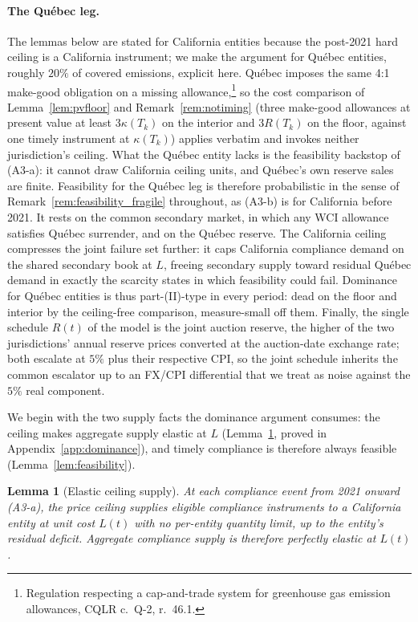 \documentclass[11pt,letterpaper]{article}
\theoremstyle{plain}
\newtheorem{lemma}[theorem]{Lemma}
\theoremstyle{definition}
\numberwithin{equation}{section}
\begin{document}
\paragraph{The Québec leg.}
The lemmas below are stated for California entities because the post-2021 hard ceiling is a California instrument; we make the argument for Québec entities, roughly $20\%$ of covered emissions, explicit here. Québec imposes the same 4:1 make-good obligation on a missing allowance,\footnote{Regulation respecting a cap-and-trade system for greenhouse gas emission allowances, CQLR c.~Q-2, r.~46.1.} so the cost comparison of Lemma~\ref{lem:pvfloor} and Remark~\ref{rem:notiming} (three make-good allowances at present value at least $3\kappa(T_k)$ on the interior and $3R(T_k)$ on the floor, against one timely instrument at $\kappa(T_k)$) applies verbatim and invokes neither jurisdiction's ceiling. What the Québec entity lacks is the feasibility backstop of (A3-a): it cannot draw California ceiling units, and Québec's own reserve sales are finite. Feasibility for the Québec leg is therefore probabilistic in the sense of Remark~\ref{rem:feasibility_fragile} throughout, as (A3-b) is for California before 2021. It rests on the common secondary market, in which any WCI allowance satisfies Québec surrender, and on the Québec reserve. The California ceiling compresses the joint failure set further: it caps California compliance demand on the shared secondary book at $L$, freeing secondary supply toward residual Québec demand in exactly the scarcity states in which feasibility could fail. Dominance for Québec entities is thus part-(II)-type in every period: dead on the floor and interior by the ceiling-free comparison, measure-small off them. Finally, the single schedule $R(t)$ of the model is the joint auction reserve, the higher of the two jurisdictions' annual reserve prices converted at the auction-date exchange rate; both escalate at $5\%$ plus their respective CPI, so the joint schedule inherits the common escalator up to an FX/CPI differential that we treat as noise against the $5\%$ real component.

We begin with the two supply facts the dominance argument consumes: the ceiling makes aggregate supply elastic at $L$ (Lemma~\ref{lem:ceiling}, proved in Appendix~\ref{app:dominance}), and timely compliance is therefore always feasible (Lemma~\ref{lem:feasibility}).

\begin{lemma}[Elastic ceiling supply]\label{lem:ceiling}
At each compliance event from 2021 onward (A3-a), the price ceiling supplies eligible compliance instruments to a California entity at unit cost $L(t)$ with no per-entity quantity limit, up to the entity's residual deficit. Aggregate compliance supply is therefore perfectly elastic at $L(t)$.
\end{lemma}
\end{document}
